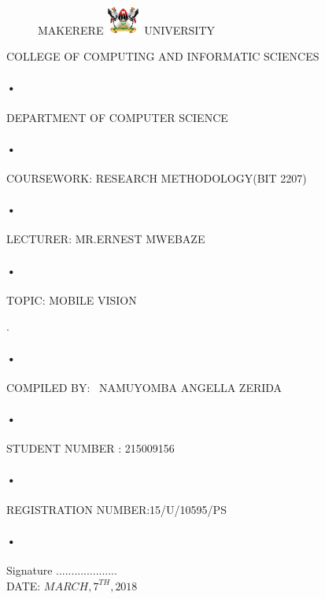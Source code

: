 \documentclass[10pt]{article}
\begin{document}
  \begin{titlepage}
  \begin{figure}[h]
  \centerline{\small MAKERERE 
  \includegraphics[width=0.1\textwidth]{muk_log} UNIVERSITY}
\end{figure}
\centerline{COLLEGE OF COMPUTING AND INFORMATIC SCIENCES}
\paragraph{•}
\centerline{DEPARTMENT OF COMPUTER SCIENCE\\}
\paragraph{•}

\centerline{COURSEWORK: RESEARCH METHODOLOGY(BIT 2207)\\}
\paragraph{•}

\centerline{LECTURER: MR.ERNEST MWEBAZE}
\paragraph{•}

\centerline{TOPIC:
 MOBILE VISION}. 
\paragraph{•}
\centerline{COMPILED BY: \
 NAMUYOMBA ANGELLA ZERIDA}
 \paragraph{•}
\centerline{STUDENT NUMBER : 215009156}
\paragraph{•}
\centerline{REGISTRATION NUMBER:15/U/10595/PS}
\paragraph{•}
\begin{flushright}
    Signature ....................\\
    DATE: $ MARCH,7^{TH},2018$
\end{flushright}

  \end{titlepage}
\end{document}
